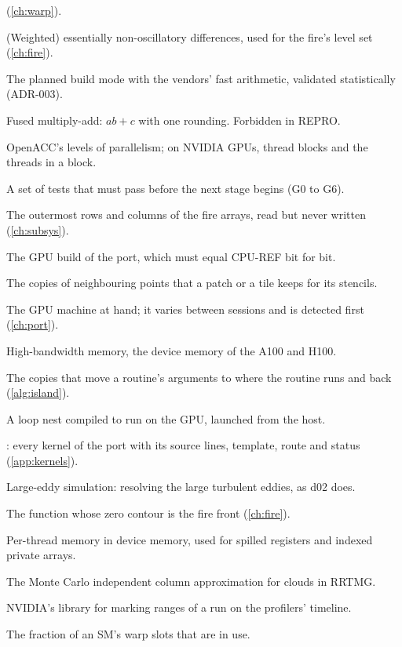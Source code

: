 \begin{description}
    (\cref{ch:warp}).
  \item[ENO, WENO] (Weighted) essentially non-oscillatory differences, used for the fire's level set
    (\cref{ch:fire}).
  \item[FAST] The planned build mode with the vendors' fast arithmetic, validated statistically (ADR-003).
  \item[FMA] Fused multiply-add: $a b + c$ with one rounding. Forbidden in REPRO.
  \item[Gang, vector] OpenACC's levels of parallelism; on NVIDIA GPUs, thread blocks and the threads in a block.
  \item[Gate] A set of tests that must pass before the next stage begins (G0 to G6).
  \item[Ghost cells] The outermost rows and columns of the fire arrays, read but never written (\cref{ch:subsys}).
  \item[GPU-REPRO] The GPU build of the port, which must equal CPU-REF bit for bit.
  \item[Halo] The copies of neighbouring points that a patch or a tile keeps for its stencils.
  \item[GPU-M] The GPU machine at hand; it varies between sessions and is detected first (\cref{ch:port}).
  \item[HBM] High-bandwidth memory, the device memory of the A100 and H100.
  \item[Island] The copies that move a routine's arguments to where the routine runs and back (\cref{alg:island}).
  \item[Kernel] A loop nest compiled to run on the GPU, launched from the host.
  \item[Kernel table] : every kernel of the port with its source lines, template, route
    and status (\cref{app:kernels}).
  \item[LES] Large-eddy simulation: resolving the large turbulent eddies, as d02 does.
  \item[Level set] The function whose zero contour is the fire front (\cref{ch:fire}).
  \item[Local memory] Per-thread memory in device memory, used for spilled registers and indexed private arrays.
  \item[McICA] The Monte Carlo independent column approximation for clouds in RRTMG.
  \item[NVTX] NVIDIA's library for marking ranges of a run on the profilers' timeline.
  \item[Occupancy] The fraction of an SM's warp slots that are in use.

\end{description}
